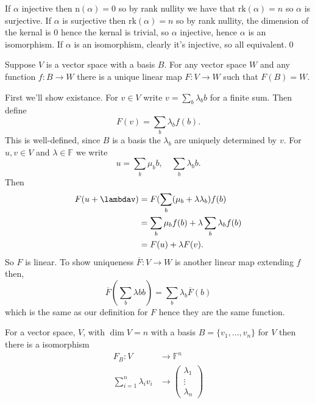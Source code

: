 \documentclass{article}
\newcommand{\F}{\mathbb{F}}
\newcommand{\n}{\mathrm{n}}
\newcommand{\rk}{\mathrm{rk}}
\begin{document}
\pf If $ \alpha $ injective then $ \n(\alpha)=0 $ so by rank nullity we have that $ \rk(\alpha)=n $ so $ \alpha $ is surjective. If $ \alpha $ is surjective then $ \rk(\alpha)=n $ so by rank nullity, the dimension of the kernal is $ 0 $ hence the kernal is trivial, so $ \alpha $ injective, hence $ \alpha $ is an isomorphism. If $ \alpha $ is an isomorphism, clearly it's injective, so all equivalent.\qed
\begin{proposition}
  Suppose $ V $ is a vector space with a basis $ B $. For any vector space $ W	 $ and any function $ f:B\to W $ there is a unique linear map $ F:V\to W $ such that $ F(B)=W $.
\end{proposition}
\pf First we'll show existance. For $ v\in V $ write $ v=\sum_b\lambda_bb $ for a finite sum. Then define
\[
  F(v)=\sum_b \lambda_bf(b).
\]
This is well-defined, since $ B $ is a basis the $ \lambda_b $ are uniquely determined by $ v $. For $ u,v\in V $ and $ \lambda\in \F $ we write
\[
  u=\sum_b\mu_bb,\quad \sum_b\lambda_bb.
\]
Then \begin{align*}
	F(u+\lambdav)&=F(\sum_b(\mu_b+\lambda\lambda_b)f(b)\\
		     &= \sum_b\mu_bf(b)+\lambda\sum_b\lambda_bf(b)\\
		     &= F(u)+\lambda F(v).
\end{align*}
So $ F $ is linear. To show uniqueness $ \overline F:V\to W $ is another linear map extending $ f $ then,
\[
  \overline F\left(\sum_b\lambda bb\right)=\sum_b\lambda_b\overline F(b)
\]
which is the same as our definition for $ F $ hence they are the same function.
\begin{corollary}
	For a vector space, $ V $, with $ \dim V=n $ with a basis $ B=\{v_1,\dots, v_n\} $ for $ V $ then there is a isomorphism
  \begin{align*}
	  F_B:V&\to \F^n\\
	       \sum_{i=1}^n\lambda_iv_i &\to \begin{pmatrix}
	        \lambda_1\\
		\vdots \\
		\lambda_n
	      \end{pmatrix}
  \end{align*}
  \end{corollary}
\end{document}
